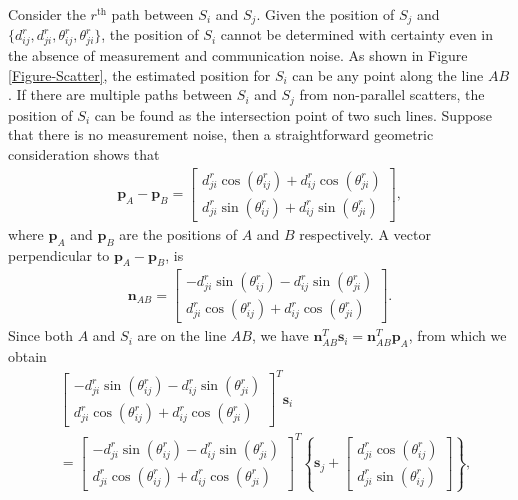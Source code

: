 \documentclass[10pt, twocolumn, final]{IEEEtran}
\begin{document}
Consider the $r^{\textrm{th}}$ path between $S_i$ and $S_j$. Given the position of $S_j$ and $\{d_{ij}^{r}, d_{ji}^{r}, \theta_{ij}^{r}, \theta_{ji}^{r}\}$, the position of $S_i$ cannot be determined with certainty even in the absence of measurement and communication noise. As shown in Figure \ref{Figure-Scatter}, the estimated position for $S_i$ can be any point along the line $AB$. If there are multiple paths between $S_i$ and $S_j$ from non-parallel scatters, the position of $S_i$ can be found as the intersection point of two such lines. Suppose that there is no measurement noise, then a straightforward geometric consideration shows that
\begin{align}
\mathbf{p}_{A} - \mathbf{p}_{B} =
\begin{bmatrix}
d_{ji}^{r}\cos(\theta_{ij}^{r}) + d_{ij}^{r}\cos(\theta_{ji}^{r}) \\
d_{ji}^{r}\sin(\theta_{ij}^{r}) + d_{ij}^{r}\sin(\theta_{ji}^{r})
\end{bmatrix},
\end{align}
where $\mathbf{p}_{A}$ and $\mathbf{p}_{B}$ are the positions of $A$ and $B$ respectively. A vector perpendicular to $\mathbf{p}_A - \mathbf{p}_B$, is
\begin{align}
\mathbf{n}_{AB} =
\begin{bmatrix}
- d_{ji}^{r}\sin(\theta_{ij}^{r}) - d_{ij}^{r}\sin(\theta_{ji}^{r}) \\
d_{ji}^{r}\cos(\theta_{ij}^{r}) + d_{ij}^{r}\cos(\theta_{ji}^{r})
\end{bmatrix}.
\end{align}
Since both $A$ and $S_i$ are on the line $AB$, we have $\mathbf{n}_{AB}^{T} \mathbf{s}_i = \mathbf{n}_{AB}^{T} \mathbf{p}_A$, from which we obtain
\begin{align*}
& \begin{bmatrix}
- d_{ji}^{r}\sin(\theta_{ij}^{r}) - d_{ij}^{r}\sin(\theta_{ji}^{r}) \\
d_{ji}^{r}\cos(\theta_{ij}^{r}) + d_{ij}^{r}\cos(\theta_{ji}^{r})
\end{bmatrix}^{T} \mathbf{s}_i \\
& =
\begin{bmatrix}
- d_{ji}^{r}\sin(\theta_{ij}^{r}) - d_{ij}^{r}\sin(\theta_{ji}^{r}) \\
d_{ji}^{r}\cos(\theta_{ij}^{r}) + d_{ij}^{r}\cos(\theta_{ji}^{r})
\end{bmatrix}^{T} \left\{ \mathbf{s}_j + \begin{bmatrix}
                                                       d_{ji}^{r} \cos(\theta_{ij}^{r}) \\
                                                       d_{ji}^{r} \sin(\theta_{ij}^{r})
                                                      \end{bmatrix}\right\},
\end{align*}
\end{document}
